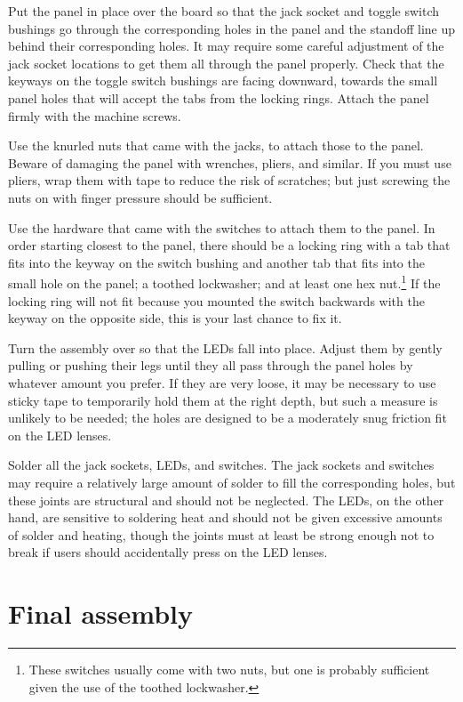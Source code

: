 Put the panel in place over the board so that the jack socket and toggle
switch bushings go through the corresponding holes in the panel and the
standoff line up behind their corresponding holes.  It may require some
careful adjustment of the jack socket locations to get them all through the
panel properly.  Check that the keyways on the toggle switch bushings are
facing downward, towards the small panel holes that will accept the tabs
from the locking rings.  Attach the panel firmly with the machine screws.

Use the knurled nuts that came with the jacks, to attach those to the panel. 
Beware of damaging the panel with wrenches, pliers, and similar.  If you
must use pliers, wrap them with tape to reduce the risk of scratches; but
just screwing the nuts on with finger pressure should be sufficient.

Use the hardware that came with the switches to attach them to the panel. 
In order starting closest to the panel, there should be a locking ring with
a tab that fits into the keyway on the switch bushing and another tab that
fits into the small hole on the panel; a toothed lockwasher; and at least
one hex nut.\footnote{These switches usually come with two nuts, but one is
probably sufficient given the use of the toothed lockwasher.} If the locking
ring will not fit because you mounted the switch backwards with the keyway
on the opposite side, this is your last chance to fix it.

Turn the assembly over so that the LEDs fall into place.  Adjust them by
gently pulling or pushing their legs until they all pass through the panel
holes by whatever amount you prefer.  If they are very loose, it may be
necessary to use sticky tape to temporarily hold them at the right depth,
but such a measure is unlikely to be needed; the holes are designed to be a
moderately snug friction fit on the LED lenses.

Solder all the jack sockets, LEDs, and switches.  The jack sockets and
switches may require a relatively large amount of solder to fill the
corresponding holes, but these joints are structural and should not be
neglected.  The LEDs, on the other hand, are sensitive to soldering heat and
should not be given excessive amounts of solder and heating, though the
joints must at least be strong enough not to break if users should
accidentally press on the LED lenses.

\section{Final assembly}

